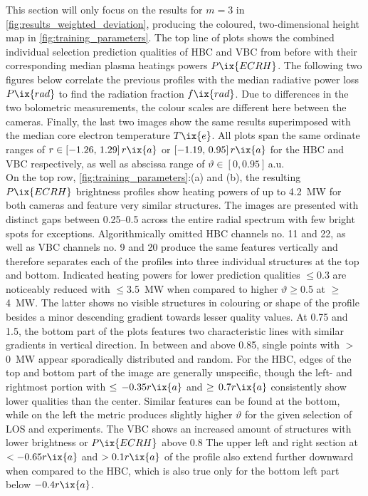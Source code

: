 %
        This section will only focus on the results for $m=3$ in \cref{fig:results_weighted_deviation}, producing the coloured, two-dimensional height map in \cref{fig:training_parameters}. The top line of plots shows the combined individual selection prediction qualities of HBC and VBC from before with their corresponding median plasma heatings powers $P\ix{ECRH}$. The following two figures below correlate the previous profiles with the median radiative power loss $P\ix{rad}$ to find the radiation fraction $f\ix{rad}$. Due to differences in the two bolometric measurements, the colour scales are different here between the cameras. Finally, the last two images show the same results superimposed with the median core electron temperature $T\ix{e}$. All plots span the same ordinate ranges of $r\in\left[-1.26,\,1.29\right]r\ix{a}$ or $\left[-1.19,\,0.95\right]r\ix{a}$ for the HBC and VBC respectively, as well as abscissa range of $\vartheta\in\left[0,0.95\right]$\,a.u.\\%
        On the top row, \cref{fig:training_parameters}:(a) and (b), the resulting $P\ix{ECRH}$ brightness profiles show heating powers of up to \SI{4.2}{\mega\watt} for both cameras and feature very similar structures. The images are presented with distinct gaps between \SIrange{0.25}{0.5}{\arbitraryunit} across the entire radial spectrum with few bright spots for exceptions. Algorithmically omitted HBC channels no. 11 and 22, as well as VBC channels no. 9 and 20 produce the same features vertically and therefore separates each of the profiles into three individual structures at the top and bottom. Indicated heating powers for lower prediction qualities $\le$\SI{0.3}{\arbitraryunit} are noticeably reduced with $\le$\SI{3.5}{\mega\watt} when compared to higher $\vartheta\ge$\SI{0.5}{\arbitraryunit} at $\ge$\SI{4}{\mega\watt}. The latter shows no visible structures in colouring or shape of the profile besides a minor descending gradient towards lesser quality values. At \SI{0.75}{\arbitraryunit} and \SI{1.5}{\arbitraryunit}, the bottom part of the plots features two characteristic lines with similar gradients in vertical direction. In between and above \SI{0.85}{\arbitraryunit}, single points with $>$\SI{0}{\mega\watt} appear sporadically distributed and random. For the HBC, edges of the top and bottom part of the image are generally unspecific, though the left- and rightmost portion with $\le\,-0.35r\ix{a}$ and $\ge\,0.7r\ix{a}$ consistently show lower qualities than the center. Similar features can be found at the bottom, while on the left the metric produces slightly higher $\vartheta$ for the given selection of LOS and experiments. The VBC shows an increased amount of structures with lower brightness or $P\ix{ECRH}$ above \SI{0.8}{\arbitraryunit} The upper left and right section at $<-0.65r\ix{a}$ and $>0.1r\ix{a}$ of the profile also extend further downward when compared to the HBC, which is also true only for the bottom left part below $-0.4r\ix{a}$.\\%
